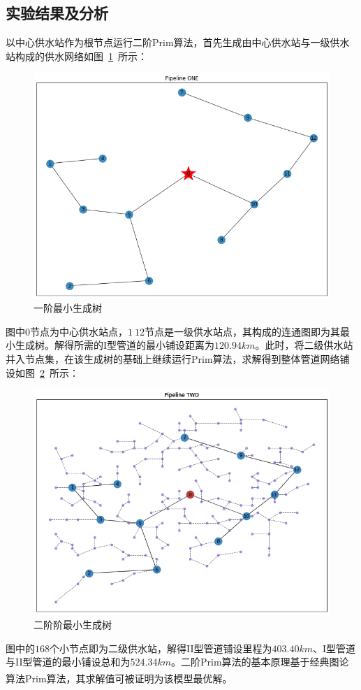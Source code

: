 \documentclass{whutmod}
\newcommand{\upcite}[1]{\textsuperscript{\cite{#1}}}
\begin{document}
        \subsection{实验结果及分析}
       以中心供水站作为根节点运行二阶Prim算法，首先生成由中心供水站与一级供水站构成的供水网络如图~\ref{sdfb}~所示：
       	\begin{figure}[H]
       	\centering
       	\includegraphics[width=.7\textwidth]{figures/444.png}
       	\caption{一阶最小生成树}\label{sdfb}
       \end{figure}
       图中$0$节点为中心供水站点，$1~12$节点是一级供水站点，其构成的连通图即为其最小生成树。解得所需的I型管道的最小铺设距离为$120.94km$。此时，将二级供水站并入节点集，在该生成树的基础上继续运行Prim算法，求解得到整体管道网络铺设如图~\ref{sgfhd}~所示：
       	\begin{figure}[H]
       	\centering
       	\includegraphics[width=\textwidth]{figures/222.png}
       	\caption{二阶阶最小生成树}\label{sgfhd}
       \end{figure}
     图中的$168$个小节点即为二级供水站，解得II型管道铺设里程为$403.40km$、I型管道与II型管道的最小铺设总和为$524.34km$。二阶Prim算法的基本原理基于经典图论算法Prim算法，其求解值可被证明为该模型最优解\upcite{1,2}。
     
\end{document}
